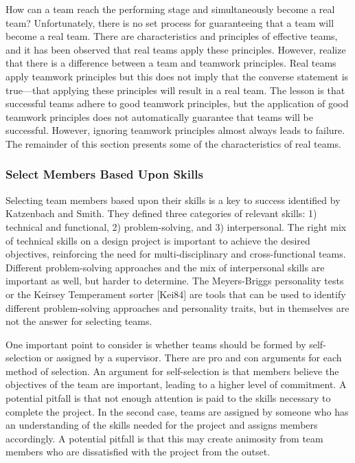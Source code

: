 How can a team reach the performing stage and simultaneously become a
real team? Unfortunately, there is no set process for guaranteeing that
a team will become a real team. There are characteristics and principles
of effective teams, and it has been observed that real teams apply these
principles. However, realize that there is a difference between a team
and teamwork principles. Real teams apply teamwork principles but this
does not imply that the converse statement is true---that applying these
principles will result in a real team. The lesson is that successful
teams adhere to good teamwork principles, but the application of good
teamwork principles does not automatically guarantee that teams will be
successful. However, ignoring teamwork principles almost always leads to
failure. The remainder of this section presents some of the
characteristics of real teams.

\subsubsection{Select Members Based Upon
Skills}\label{select-members-based-upon-skills}

Selecting team members based upon their skills is a key to success
identified by Katzenbach and Smith. They defined three categories of
relevant skills: 1) technical and functional, 2) problem-solving, and 3)
interpersonal. The right mix of technical skills on a design project is
important to achieve the desired objectives, reinforcing the need for
multi-disciplinary and cross-functional teams. Different problem-solving
approaches and the mix of interpersonal skills are important as well,
but harder to determine. The Meyers-Briggs personality tests or the
Keirsey Temperament sorter {[}Kei84{]} are tools that can be used to
identify different problem-solving approaches and personality traits,
but in themselves are not the answer for selecting teams.

One important point to consider is whether teams should be formed by
self-selection or assigned by a supervisor. There are pro and con
arguments for each method of selection. An argument for self-selection
is that members believe the objectives of the team are important,
leading to a higher level of commitment. A potential pitfall is that not
enough attention is paid to the skills necessary to complete the
project. In the second case, teams are assigned by someone who has an
understanding of the skills needed for the project and assigns members
accordingly. A potential pitfall is that this may create animosity from
team members who are dissatisfied with the project from the outset.

